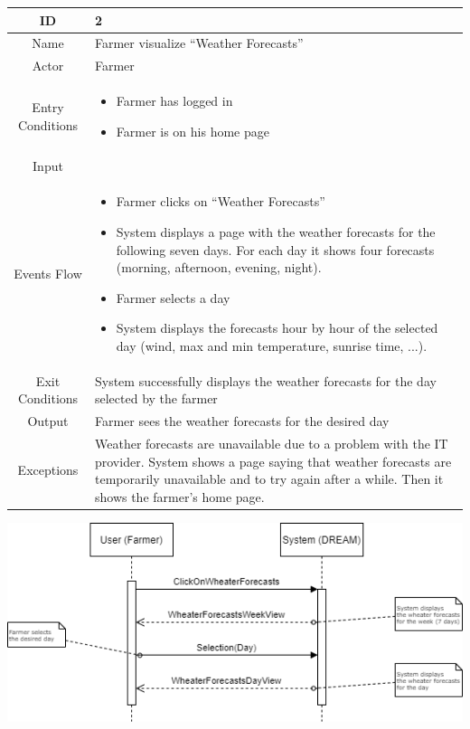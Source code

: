 \documentclass{article}
\begin{document}
\begin{center}
    \begin{longtable}{|c| p{10cm}|}
        \hline
            ID & 2 \\
        \hline
            Name & Farmer visualize “Weather Forecasts” \\
        \hline
            Actor & Farmer \\
        \hline
            Entry Conditions & 
                    \begin{itemize}
                        \item Farmer has logged in
                        \item Farmer is on his home page
                    \end{itemize}\\
        \hline
            Input & \\
        \hline
            Events Flow & 
                    \begin{itemize}
                        \item Farmer clicks on “Weather Forecasts”
                        \item System displays a page with the weather forecasts for the following seven days. For each day it shows four forecasts (morning, afternoon, evening, night). 
                        \item Farmer selects a day
                        \item System displays the forecasts hour by hour of the selected day (wind, max and min temperature, sunrise time, ...).
                    \end{itemize}\\
        \hline
        Exit Conditions & System successfully displays the weather forecasts for the                     day selected by the farmer\\
        \hline
            Output & Farmer sees the weather forecasts for the desired day \\
        \hline
            Exceptions & Weather forecasts are unavailable due to a problem with the              IT provider. System shows a page saying that weather forecasts             are temporarily unavailable and to try again after a while.               Then it shows the farmer's home page.\\
        \hline
    \end{longtable}
    
    
    \includegraphics[width=1\textwidth]{images/sequenceDiagrams/2. FarmerWheatherForecasts.png}
    \par
    \caption{\label{fig:frog}Farmer visualizes wheater forecast}
    

\end{center}
\end{document}
